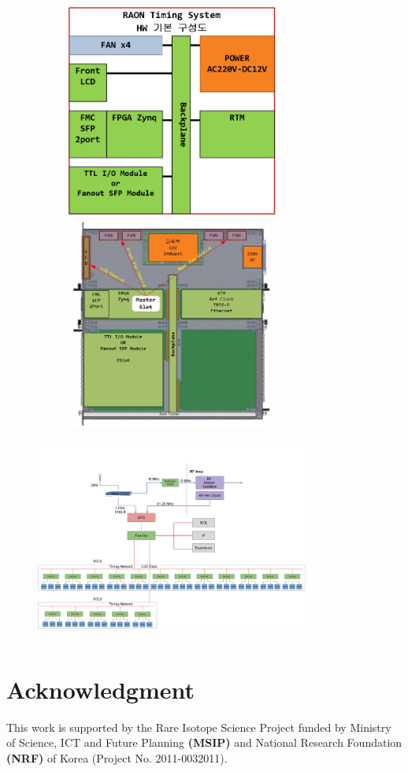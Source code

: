 \documentclass[journal,reqno]{IEEEtran}
\begin{document}
\begin{figure}[!htb]
	\centering
	\includegraphics*[width=90mm, height=70mm]{img03.png}
	\includegraphics*[width=90mm, height=70mm]{img04.png}
	\includegraphics*[width=90mm, height=70mm]{img25.png}
\end{figure}

\section*{Acknowledgment}
This work is supported by the Rare Isotope Science Project funded by Ministry of Science, ICT and Future Planning \textbf{(MSIP)} and National Research Foundation \textbf{(NRF)} of Korea (Project No. 2011-0032011).
\end{document}
